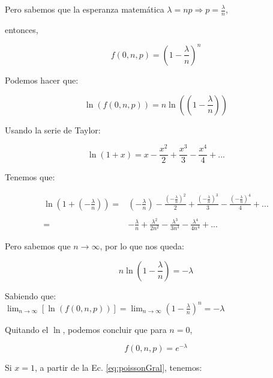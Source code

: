 Pero sabemos que la esperanza matemática $\lambda = np \Rightarrow p =
\frac{\lambda}{n}$,
  
entonces,

\begin{equation}
  f(0,n,p) = (1-\frac{\lambda}{n})^n
\end{equation}

Podemos hacer que:

\begin{equation}
  \ln(f(0,n,p)) = n \ln((1-\frac{\lambda}{n}))
\end{equation}

Usando la serie de Taylor:

\begin{equation}
  \ln(1+x) = x - \frac{x^2}{2} + \frac{x^3}{3} - \frac{x^4}{4} + ...
\end{equation}

Tenemos que:

\begin{equation}
  \begin{array}{rl}
  \ln(1+(-\frac{\lambda}{n})) = & (-\frac{\lambda}{n}) - \frac{(-\frac{\lambda}{n})^2}{2} + \frac{(-\frac{\lambda}{n})^3}{3} - \frac{(-\frac{\lambda}{n})^4}{4} + ... \\
  \\
                              = & -\frac{\lambda}{n} + \frac{\lambda^2}{2n^2} - \frac{\lambda^3}{3n^3} - \frac{\lambda^4}{4n^4}+...
  \end{array}
\end{equation}

Pero sabemos que $n \to \infty$, por lo que nos queda:

\begin{equation}
  n \ln(1-\frac{\lambda}{n}) = -\lambda
\end{equation}  

Sabiendo que: \\

$ \lim_{n \to \infty} [\ln (f(0,n,p))] = \lim_{n \to \infty} (1 -
\frac{\lambda}{n})^n = -\lambda$


Quitando el $\ln$, podemos concluir que para $n=0$,

\begin{equation}
  f(0,n,p) = e^{-\lambda}
\end{equation}

Si $x=1$, a partir de la Ec. \eqref{eq:poissonGral}, tenemos:

